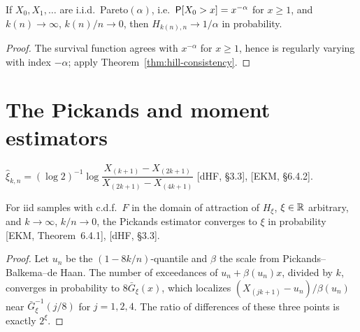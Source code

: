 \begin{corollary}
  \label{cor:hill-pareto}
  \leanok
  If $X_0, X_1, \ldots$ are i.i.d.\ Pareto$(\alpha)$, i.e.\ $\mathsf{P}[X_0 > x] = x^{-\alpha}$ for
  $x \ge 1$, and $k(n) \to \infty$, $k(n)/n \to 0$, then $H_{k(n),n} \to 1/\alpha$ in probability.
\end{corollary}
\begin{proof}
  \leanok
  The survival function agrees with $x^{-\alpha}$ for $x \ge 1$, hence is regularly varying with
  index $-\alpha$; apply Theorem~\ref{thm:hill-consistency}.
\end{proof}

\section{The Pickands and moment estimators}

\begin{definition}
  \label{def:pickands}
  \leanok
  $\hat\xi_{k,n} = (\log 2)^{-1} \log \dfrac{X_{(k+1)} - X_{(2k+1)}}{X_{(2k+1)} - X_{(4k+1)}}$
  [dHF, \S3.3], [EKM, \S6.4.2].
\end{definition}

\begin{theorem}
  \label{thm:pickands-consistency}
  \leanok
  For iid samples with c.d.f.\ $F$ in the domain of attraction of $H_\xi$, $\xi \in \mathbb{R}$
  arbitrary, and $k \to \infty$, $k/n \to 0$, the Pickands estimator converges to $\xi$ in
  probability [EKM, Theorem~6.4.1], [dHF, \S3.3].
\end{theorem}
\begin{proof}
  \leanok
  Let $u_n$ be the $(1 - 8k/n)$-quantile and $\beta$ the scale from
  Pickands--Balkema--de Haan. The number of exceedances of $u_n + \beta(u_n) x$, divided by $k$,
  converges in probability to $8 \bar G_{\xi}(x)$, which localizes
  $(X_{(jk+1)} - u_n)/\beta(u_n)$ near $\bar G_\xi^{-1}(j/8)$ for $j = 1, 2, 4$. The ratio of
  differences of these three points is exactly $2^\xi$.
\end{proof}

